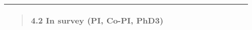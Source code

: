 \begin{longtable}[]{@{}lllllllllll@{}}
\begin{minipage}[t]{0.07\columnwidth}
\begin{quote}
4.2 In survey (PI, Co-PI, PhD3) \end{quote}\strut \end{minipage} & \begin{minipage}[t]{0.07\columnwidth}\raggedright \strut \end{minipage} & \begin{minipage}[t]{0.07\columnwidth}\raggedright \strut \end{minipage} & \begin{minipage}[t]{0.07\columnwidth}\raggedright \strut \end{minipage} & \begin{minipage}[t]{0.07\columnwidth}\raggedright \strut \end{minipage} & \begin{minipage}[t]{0.07\columnwidth}\raggedright \strut \end{minipage} & \begin{minipage}[t]{0.07\columnwidth}\raggedright \strut \end{minipage} & \begin{minipage}[t]{0.07\columnwidth}\raggedright \strut \end{minipage} & \begin{minipage}[t]{0.07\columnwidth}\raggedright \strut \end{minipage} & \begin{minipage}[t]{0.07\columnwidth}\raggedright \strut \end{minipage} & \begin{minipage}[t]{0.07\columnwidth}\raggedright \strut \end{minipage}\tabularnewline \bottomrule \end{longtable}